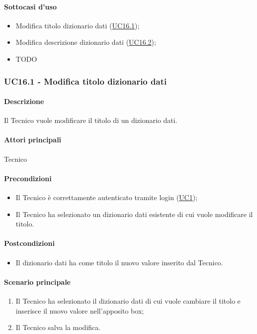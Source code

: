 \paragraph*{Sottocasi d'uso}
\begin{itemize}
  \item Modifica titolo dizionario dati (\hyperref[UC16point1]{UC16.1});
  \item Modifica descrizione dizionario dati (\hyperref[UC16point2]{UC16.2});
  \item TODO
\end{itemize}


\subsubsection{UC16.1 - Modifica titolo dizionario dati}\label{UC16point1}
\paragraph*{Descrizione} Il Tecnico vuole modificare il titolo di un dizionario dati.
\paragraph*{Attori principali} Tecnico
\paragraph*{Precondizioni}
\begin{itemize}
  \item Il Tecnico è correttamente autenticato tramite login (\hyperref[UC1]{UC1});
  \item Il Tecnico ha selezionato un dizionario dati esistente di cui vuole modificare il titolo.  
\end{itemize}
\paragraph*{Postcondizioni}
\begin{itemize}
  \item Il dizionario dati ha come titolo il nuovo valore inserito dal Tecnico.
\end{itemize}
\paragraph*{Scenario principale}
\begin{enumerate}
  \item Il Tecnico ha selezionato il dizionario dati di cui vuole cambiare il titolo e inserisce il nuovo valore nell’apposito box;
  \item Il Tecnico salva la modifica.  
\end{enumerate}


